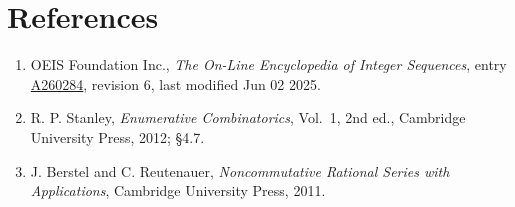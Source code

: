 \documentclass[11pt]{article}
\theoremstyle{definition}
\begin{document}
\section{References}

\begin{enumerate}

\item OEIS Foundation Inc., \emph{The On-Line Encyclopedia of Integer Sequences}, entry \href{https://oeis.org/A260284}{A260284}, revision 6, last modified Jun 02 2025.

\item R. P. Stanley, \emph{Enumerative Combinatorics}, Vol.~1, 2nd ed., Cambridge University Press, 2012; \S4.7.

\item J. Berstel and C. Reutenauer, \emph{Noncommutative Rational Series with Applications}, Cambridge University Press, 2011.

\end{enumerate}
\end{document}
